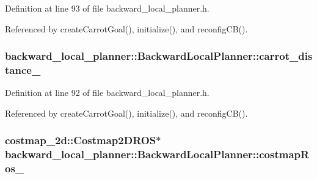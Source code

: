 Definition at line 93 of file backward\+\_\+local\+\_\+planner.\+h.



Referenced by create\+Carrot\+Goal(), initialize(), and reconfig\+C\+B().

\subsubsection[{\texorpdfstring{carrot\+\_\+distance\+\_\+}{carrot_distance_}}]{ backward\+\_\+local\+\_\+planner\+::\+Backward\+Local\+Planner\+::carrot\+\_\+distance\+\_\+\hspace{0.3cm}{\ttfamily [private]}}\hypertarget{classbackward__local__planner_1_1BackwardLocalPlanner_a969063a163a35ad5c234d03a77528657}{}\label{classbackward__local__planner_1_1BackwardLocalPlanner_a969063a163a35ad5c234d03a77528657}


Definition at line 92 of file backward\+\_\+local\+\_\+planner.\+h.



Referenced by create\+Carrot\+Goal(), initialize(), and reconfig\+C\+B().

\subsubsection[{\texorpdfstring{costmap\+Ros\+\_\+}{costmapRos_}}]{\setlength{\rightskip}{0pt plus 5cm}costmap\+\_\+2d\+::\+Costmap2\+D\+R\+OS$\ast$ backward\+\_\+local\+\_\+planner\+::\+Backward\+Local\+Planner\+::costmap\+Ros\+\_\+\hspace{0.3cm}{\ttfamily [private]}}\hypertarget{classbackward__local__planner_1_1BackwardLocalPlanner_a0d1ac7384b0b241f4b77a0490165430a}{}\label{classbackward__local__planner_1_1BackwardLocalPlanner_a0d1ac7384b0b241f4b77a0490165430a}


